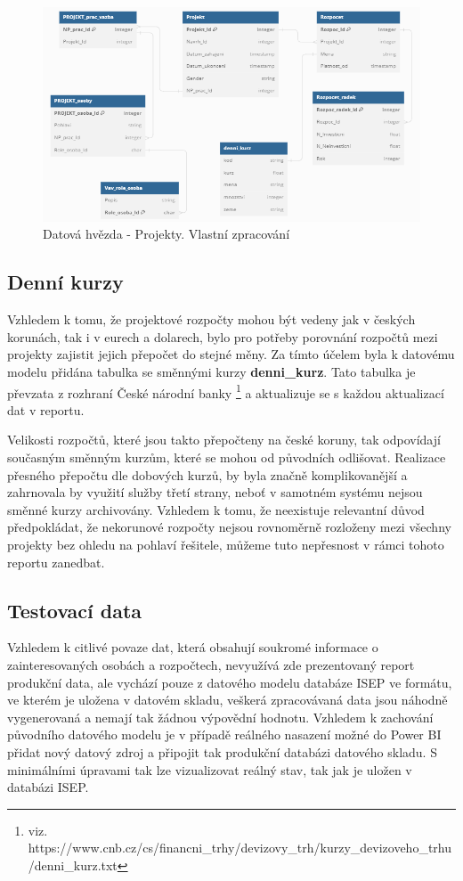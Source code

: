 \documentclass[
  digital,     %
  twoside,     %
  lof,         %
  lot,         %
]{fithesis4}
\begin{document}
    \begin{figure}[t]
        \begin{center}
            \includegraphics[width=13cm]{img/projects_sch.png}
        \end{center}
        \caption{Datová hvězda - Projekty. Vlastní zpracování}
        \label{fig:projects_sch}
    \end{figure} 

\subsection{Denní kurzy}
\label{denni-kurz}
Vzhledem k tomu, že projektové rozpočty mohou být vedeny jak v českých korunách, tak i v eurech a dolarech, bylo pro potřeby porovnání rozpočtů mezi projekty zajistit jejich přepočet do stejné měny. Za tímto účelem byla k datovému modelu přidána tabulka se směnnými kurzy \textbf{denni\_kurz}. Tato tabulka je převzata z rozhraní České národní banky \footnote{viz. https://www.cnb.cz/cs/financni\_trhy/devizovy\_trh/kurzy\_devizoveho\_trhu/denni\_kurz.txt} a aktualizuje se s každou aktualizací dat v reportu. 

Velikosti rozpočtů, které jsou takto přepočteny na české koruny, tak odpovídají současným směnným kurzům, které se mohou od původních odlišovat. Realizace přesného přepočtu dle dobových kurzů, by byla značně komplikovanější a zahrnovala by využití služby třetí strany, neboť v samotném systému nejsou směnné kurzy archivovány. Vzhledem k tomu, že neexistuje relevantní důvod předpokládat, že nekorunové rozpočty nejsou rovnoměrně rozloženy mezi všechny projekty bez ohledu na pohlaví řešitele, můžeme tuto nepřesnost v rámci tohoto reportu zanedbat.

\subsection{Testovací data}
\label{testovaci-data}
Vzhledem k citlivé povaze dat, která obsahují soukromé informace o zainteresovaných osobách a rozpočtech, nevyužívá zde prezentovaný report produkční data, ale vychází pouze z datového modelu databáze ISEP ve formátu, ve kterém je uložena v datovém skladu, veškerá zpracovávaná data jsou náhodně vygenerovaná a nemají tak žádnou výpovědní hodnotu. Vzhledem k zachování původního datového modelu je v případě reálného nasazení možné do Power BI přidat nový datový zdroj a připojit tak produkční databázi datového skladu. S minimálními úpravami tak lze vizualizovat reálný stav, tak jak je uložen v databázi ISEP. 
\end{document}
